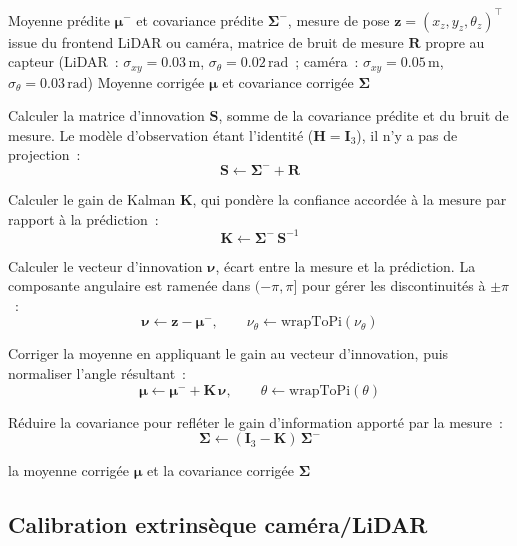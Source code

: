 \documentclass[12pt,a4paper]{report}
\begin{document}
\begin{algorithm}[H]
  \caption{EKF — étape de correction par mesure de pose (LiDAR ou caméra)}\label{alg:ekf-update}
  \begin{algorithmic}[1]
    \Require Moyenne prédite $\boldsymbol{\mu}^-$ et covariance prédite $\boldsymbol{\Sigma}^-$,
    mesure de pose $\mathbf{z} = (x_z, y_z, \theta_z)^\top$ issue du frontend LiDAR ou caméra,
    matrice de bruit de mesure $\mathbf{R}$ propre au capteur
    (LiDAR~: $\sigma_{xy} = 0.03\,\text{m}$, $\sigma_\theta = 0.02\,\text{rad}$~;
    caméra~: $\sigma_{xy} = 0.05\,\text{m}$, $\sigma_\theta = 0.03\,\text{rad}$)
    \Ensure  Moyenne corrigée $\boldsymbol{\mu}$ et covariance corrigée $\boldsymbol{\Sigma}$

    \State Calculer la matrice d'innovation $\mathbf{S}$, somme de la covariance prédite et du bruit de mesure.
    Le modèle d'observation étant l'identité ($\mathbf{H} = \mathbf{I}_3$), il n'y a pas de projection~:
    \[
      \mathbf{S} \gets \boldsymbol{\Sigma}^- + \mathbf{R}
    \]

    \State Calculer le gain de Kalman $\mathbf{K}$, qui pondère la confiance accordée à la mesure
    par rapport à la prédiction~:
    \[
      \mathbf{K} \gets \boldsymbol{\Sigma}^-\, \mathbf{S}^{-1}
    \]

    \State Calculer le vecteur d'innovation $\boldsymbol{\nu}$, écart entre la mesure et la prédiction.
    La composante angulaire est ramenée dans $(-\pi, \pi]$ pour gérer les discontinuités à $\pm\pi$~:
    \[
      \boldsymbol{\nu} \gets \mathbf{z} - \boldsymbol{\mu}^-, \qquad
      \nu_\theta \gets \mathrm{wrapToPi}(\nu_\theta)
    \]

    \State Corriger la moyenne en appliquant le gain au vecteur d'innovation,
    puis normaliser l'angle résultant~:
    \[
      \boldsymbol{\mu} \gets \boldsymbol{\mu}^- + \mathbf{K}\,\boldsymbol{\nu}, \qquad
      \theta \gets \mathrm{wrapToPi}(\theta)
    \]

    \State Réduire la covariance pour refléter le gain d'information apporté par la mesure~:
    \[
      \boldsymbol{\Sigma} \gets (\mathbf{I}_3 - \mathbf{K})\,\boldsymbol{\Sigma}^-
    \]

    \State \Return la moyenne corrigée $\boldsymbol{\mu}$ et la covariance corrigée $\boldsymbol{\Sigma}$
  \end{algorithmic}
\end{algorithm}

\subsection{Calibration extrinsèque caméra/LiDAR}
\end{document}
